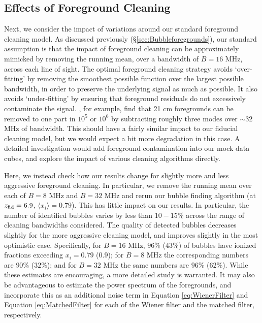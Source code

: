 \subsection{Effects of Foreground Cleaning} \label{sec:BubbleForegroundCleaning}

Next, we consider the impact of variations around our standard foreground
cleaning model. As discussed previously (\S \ref{sec:Bubbleforegrounds}), our
standard assumption is that the impact of foreground cleaning
can be approximately mimicked by removing the running mean, over a bandwidth
of $B=16$ MHz, across each line of sight. The optimal foreground cleaning
strategy avoids `over-fitting' by removing the smoothest possible function
over the largest possible bandwidth, in order to preserve the underlying signal
as much as possible. It also avoids `under-fitting' by ensuring that foreground
residuals do not excessively contaminate the signal. \citet{Liu:2011ih}, for
example, find that 21 cm foregrounds can be removed to one part in
$10^5$ or $10^6$ by subtracting roughly three modes over $\sim 32$ MHz of
bandwidth. This should have a fairly similar impact to our fiducial
cleaning model, but we would expect a bit more degradation in this case.
A detailed investigation would add foreground contamination into our
mock data cubes, and explore the impact of various cleaning algorithms directly.

Here, we instead check how our results change for slightly more
and less aggressive foreground cleaning. In particular, we remove
the running mean over each of $B=8$ MHz and $B=32$ MHz and rerun our
bubble finding algorithm (at $z_{\rm fid} = 6.9$, $\langle x_i \rangle = 0.79$). This has
little impact on our results. In particular, the number of identified
bubbles varies by less than $10-15\%$ across the range of cleaning
bandwidths considered. The quality of detected bubbles decreases slightly
for the more aggressive cleaning model, and improves slightly in the most optimistic
case. Specifically, for $B=16$ MHz, $96\%$ ($43\%$) of bubbles have
ionized fractions exceeding $x_i = 0.79$ ($0.9$); for $B=8$ MHz the
corresponding numbers are $90\%$ ($32\%$); and for $B=32$ MHz
the same numbers are $96\%$ ($62\%$). While these estimates are encouraging,
a more detailed study is warranted. It may also be advantageous to
estimate the power spectrum of the foregrounds, and incorporate this
as an additional noise term in Equation \ref{eq:WienerFilter} and Equation \ref{eq:MatchedFilter} for each of the Wiener filter and the matched filter, respectively.

